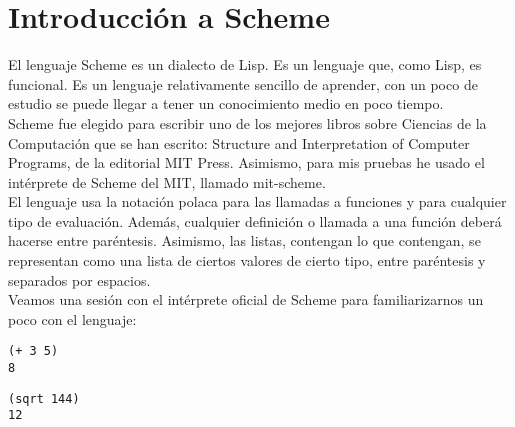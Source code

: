 

\section{Introducci\'on a Scheme}
\label{3:sec1}

El lenguaje Scheme es un dialecto de Lisp. Es un lenguaje que, como Lisp, es funcional. Es un lenguaje relativamente sencillo de aprender, con un poco de estudio se puede llegar a tener un conocimiento medio en poco tiempo.\\

Scheme fue elegido para escribir uno de los mejores libros sobre Ciencias de la Computaci\'on que se han escrito: Structure and Interpretation of Computer Programs, de la editorial MIT Press. Asimismo, para mis pruebas he usado el int\'erprete de Scheme del MIT, llamado mit-scheme.\\

El lenguaje usa la notaci\'on polaca para las llamadas a funciones y para cualquier tipo de evaluaci\'on. Adem\'as, cualquier definici\'on o llamada a una funci\'on deber\'a hacerse entre par\'entesis. Asimismo, las listas, contengan lo que contengan, se representan como una lista de ciertos valores de cierto tipo, entre par\'entesis y separados por espacios.\\

Veamos una sesi\'on con el int\'erprete oficial de Scheme para familiarizarnos un poco con el lenguaje:\\

\begin{minipage}{\linewidth}
\begin{small}
\begin{lstlisting}[frame=single]
(+ 3 5)
8
\end{lstlisting}
\end{small}
\end{minipage}

\begin{minipage}{\linewidth}
\begin{small}
\begin{lstlisting}[frame=single]
(sqrt 144)
12
\end{lstlisting}
\end{small}
\end{minipage}

